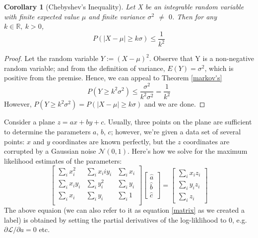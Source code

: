 \documentclass[10pt, Computer Modern]{article}
\newtheorem{corollary}[theorem]{Corollary}
\theoremstyle{remark}
\begin{document}
\begin{corollary}[Chebyshev's Inequality]
\label{chebyshev's}
Let X be an integrable random variable with finite expected value $\mu$ and finite variance $\sigma^2$ $\ne$ $0$. Then for any $k \in \mathbb{R},~ k > 0$,  
\begin{equation*}
P(|X - \mu| \geq k\sigma) \leq \frac{1}{k^2}
\end{equation*}

\end{corollary}
\begin{proof}
Let the random variable $Y := (X - \mu)^2$. Observe that Y is a non-negative random variable; and from the definition of variance, $E(Y) = \sigma^2$, which is positive from the premise. Hence, we can appeal to Theorem \ref{markov's}
\begin{equation*}
P(Y \geq k^2\sigma^2) \leq \frac{\sigma^2}{k^2\sigma^2} = \frac{1}{k^2}
\end{equation*}
However, $P(Y \geq k^2\sigma^2) = P(|X - \mu| \geq k\sigma)$ and we are done.
\end{proof} 
Consider a plane $z = ax + by +c$. Usually, three points on the plane are sufficient to determine the parameters  $a$, $b$, $c$; however, we're given a data set of several points: $x$ and $y$ coordinates are known perfectly, but the $z$ coordinates are corrupted by a Gaussian noise $\mathcal{N}(0,1)$. Here's how we solve for the maximum likelihood estimates of the parameters:
\begin{equation}\label{matrix}
\begin{bmatrix}
		\sum_{i}x_{i}^2	 &  \sum_{i}x_{i}{i}y_{i}   &  \sum_{i}x_{i} \\
		\sum_{i}x_{i}y_{i}	 &  \sum_{i}y_{i}^2   &  \sum_{i}y_{i}  \\
		\sum_{i}x_{i}	&   \sum_{i}y_{i}   &  \sum_{i}1   \\ 
\end{bmatrix}
\begin{bmatrix}
	\hat{a}  \\  \hat{b}  \\ \hat{c}
\end{bmatrix} = 
\begin{bmatrix}
	\sum_{i}x_{i}z_{i}  \\ \sum_{i}y_{i}z_{i}	\\ \sum_{i}z_{i}
\end{bmatrix}
\end{equation}
The above equaion (we can also refer to it as equation \ref{matrix} as we created a label) is obtained by setting the partial derivatives of the log-liklihood to 0, e.g. $\partial \mathcal{L}/\partial a = 0$ etc.
\end{document}
